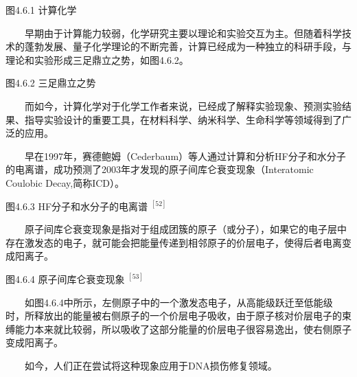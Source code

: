 \documentclass[a4paper,11pt,english]{sphinxmanual}
\begin{document}
\begin{center}图4.6.1 计算化学
\end{center}
\sphinxAtStartPar
{}

\sphinxAtStartPar
  早期由于计算能力较弱，化学研究主要以理论和实验交互为主。但随着科学技术的蓬勃发展、量子化学理论的不断完善，计算已经成为一种独立的科研手段，与理论和实验形成三足鼎立之势，如图4.6.2。


\begin{center}图4.6.2 三足鼎立之势
\end{center}
\sphinxAtStartPar
  而如今，计算化学对于化学工作者来说，已经成了解释实验现象、预测实验结果、指导实验设计的重要工具，在材料科学、纳米科学、生命科学等领域得到了广泛的应用。

\sphinxAtStartPar
{} 

\sphinxAtStartPar
  早在1997年，赛德鲍姆（Cederbaum）等人通过计算和分析HF分子和水分子的电离谱，成功预测了2003年才发现的原子间库仑衰变现象（Interatomic Coulobic Decay,简称ICD）。


\begin{center}图4.6.3 HF分子和水分子的电离谱  \(^{[52]}\)
\end{center}
\sphinxAtStartPar
  原子间库仑衰变现象是指对于组成团簇的原子（或分子），如果它的电子层中存在激发态的电子，就可能会把能量传递到相邻原子的价层电子，使得后者电离变成阳离子。


\begin{center}图4.6.4 原子间库仑衰变现象 \(^{[53]}\)
\end{center}
\sphinxAtStartPar
  如图4.6.4中所示，左侧原子中的一个激发态电子，从高能级跃迁至低能级时，所释放出的能量被右侧原子的一个价层电子吸收，由于原子核对价层电子的束缚能力本来就比较弱，所以吸收了这部分能量的价层电子很容易逸出，使右侧原子变成阳离子。

\sphinxAtStartPar
  如今，人们正在尝试将这种现象应用于DNA损伤修复领域。
\end{document}
